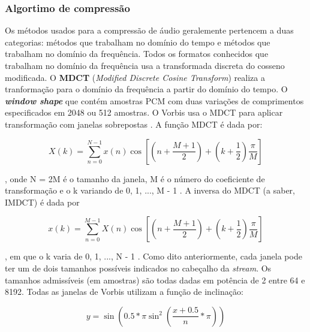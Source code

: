 \subsubsection{Algortimo de compressão}

Os métodos usados para a compressão de áudio geralemente pertencem a duas categorias: métodos que trabalham no domínio do tempo e métodos que trabalham no domínio da frequência. Todos os formatos conhecidos que trabalham no domínio da frequência usa a transformada discreta do cosseno modificada. O \textbf{MDCT} (\textit{Modified Discrete Cosine Transform}) realiza a tranformação para o domínio da frequência a partir do domínio do tempo. O \textbf{\textit{window shape}} que contém amostras PCM com duas variações de comprimentos especificados em 2048 ou 512 amostras. O Vorbis usa o MDCT para aplicar transformação com janelas sobrepostas \cite{vorbis}. A função MDCT é dada por:

\begin{equation}
X(k) = \sum_{n=0}^{N-1} x(n) \cos \left [ \left ( n + \frac{M+1}{2} \right ) + \left ( k+\frac{1}{2} \right ) \frac{\pi}{M} \right ]
\end{equation}

, onde N = 2M é o tamanho da janela, M é o número do coeficiente de transformação e o k variando de 0, 1, ..., M - 1 \cite{mdct}. A inversa do MDCT (a saber, IMDCT) é dada por 

\begin{equation}
x(k) = \sum_{n=0}^{M-1} X(n) \cos \left [ \left ( n + \frac{M+1}{2} \right ) + \left ( k+\frac{1}{2} \right ) \frac{\pi}{M} \right ]
\end{equation}

, em que o k varia de 0, 1, ..., N - 1 \cite{mdct}. Como dito anteriormente, cada janela pode ter um de dois tamanhos possíveis indicados no cabeçalho da \textit{stream}. Os tamanhos admissíveis (em amostras) são todas dadas em potência de 2 entre 64 e 8192. Todas as janelas de Vorbis utilizam a função de inclinação:

\begin{equation}
y = \sin \left ( 0.5 * \pi\sin^{2}\left ( \frac{x+0.5}{n}*\pi \right ) \right )
\end{equation}

